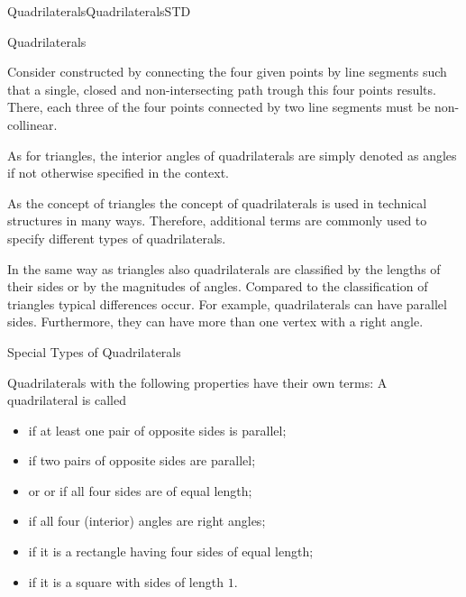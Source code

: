 \begin{MXContent}{Quadrilaterals}{Quadrilaterals}{STD}
\begin{MXInfo}{Quadrilaterals}%

Consider  constructed by connecting the 
four given points by line segments such that a single, closed and 
non-intersecting path trough this four points results. There, each three of 
the four points connected by two line segments must be non-collinear. 

As for triangles, the interior angles of quadrilaterals are simply denoted 
as angles if not otherwise specified in the context.
\end{MXInfo}

As the concept of triangles the concept of quadrilaterals is used in technical structures in many
ways. Therefore, additional terms are commonly used to specify different types of quadrilaterals. 

In the same way as triangles also quadrilaterals are classified by the lengths of their 
sides or by the magnitudes of angles. Compared to the classification of triangles 
typical differences occur. For example, quadrilaterals can have parallel sides. 
Furthermore, they can have more than one vertex with a right angle. 

\begin{MXInfo}{Special Types of Quadrilaterals}%

Quadrilaterals with the following properties have their own terms:
A quadrilateral is called

\begin{itemize}
\item {} if at least one pair of opposite sides is parallel;
\item {} if two pairs of opposite sides are parallel;
\item {} or 
  or
  if all four sides are of equal length;
\item {} if all four (interior) angles are right angles;
\item {} if it is a rectangle having four sides  of equal length;
\item {} if it is a square with sides of length $1$.
\end{itemize}
\end{MXInfo}


\end{MXContent}
